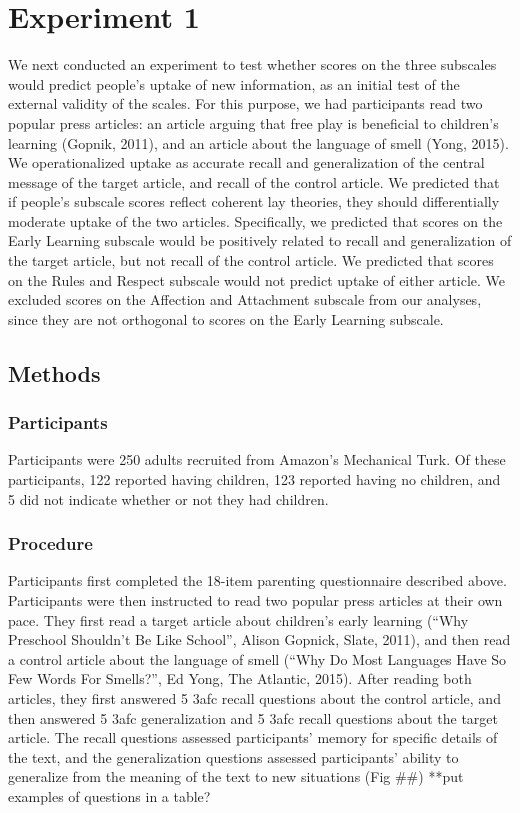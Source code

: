 \documentclass[10pt, letterpaper]{article}
\begin{document}
\section{Experiment 1}\label{experiment-1}

We next conducted an experiment to test whether scores on the three
subscales would predict people's uptake of new information, as an
initial test of the external validity of the scales. For this purpose,
we had participants read two popular press articles: an article arguing
that free play is beneficial to children's learning (Gopnik, 2011), and
an article about the language of smell (Yong, 2015). We operationalized
uptake as accurate recall and generalization of the central message of
the target article, and recall of the control article. We predicted that
if people's subscale scores reflect coherent lay theories, they should
differentially moderate uptake of the two articles. Specifically, we
predicted that scores on the Early Learning subscale would be positively
related to recall and generalization of the target article, but not
recall of the control article. We predicted that scores on the Rules and
Respect subscale would not predict uptake of either article. We excluded
scores on the Affection and Attachment subscale from our analyses, since
they are not orthogonal to scores on the Early Learning subscale.

\subsection{Methods}\label{methods}

\subsubsection{Participants}\label{participants}

Participants were 250 adults recruited from Amazon's Mechanical Turk. Of
these participants, 122 reported having children, 123 reported having no
children, and 5 did not indicate whether or not they had children.

\subsubsection{Procedure}\label{procedure}

Participants first completed the 18-item parenting questionnaire
described above. Participants were then instructed to read two popular
press articles at their own pace. They first read a target article about
children's early learning (``Why Preschool Shouldn't Be Like School'',
Alison Gopnick, Slate, 2011), and then read a control article about the
language of smell (``Why Do Most Languages Have So Few Words For
Smells?'', Ed Yong, The Atlantic, 2015). After reading both articles,
they first answered 5 3afc recall questions about the control article,
and then answered 5 3afc generalization and 5 3afc recall questions
about the target article. The recall questions assessed participants'
memory for specific details of the text, and the generalization
questions assessed participants' ability to generalize from the meaning
of the text to new situations (Fig \#\#) **put examples of questions in
a table?
\end{document}
